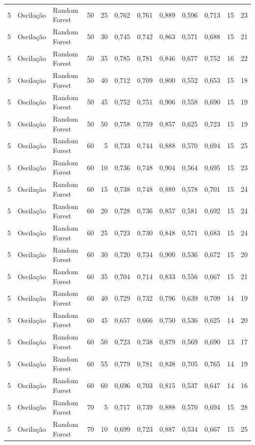 \begin{longtable}{@{}rllrrrrrrrrr@{}}
5 & Oscilação & Random Forest & 50 & 25 & 0,762 & 0,761 & 0,889 & 0,596 & 0,713 & 15 & 23 \\
5 & Oscilação & Random Forest & 50 & 30 & 0,745 & 0,742 & 0,863 & 0,571 & 0,688 & 15 & 21 \\
5 & Oscilação & Random Forest & 50 & 35 & 0,785 & 0,781 & 0,846 & 0,677 & 0,752 & 16 & 22 \\
5 & Oscilação & Random Forest & 50 & 40 & 0,712 & 0,709 & 0,800 & 0,552 & 0,653 & 15 & 18 \\
5 & Oscilação & Random Forest & 50 & 45 & 0,752 & 0,751 & 0,906 & 0,558 & 0,690 & 15 & 19 \\
5 & Oscilação & Random Forest & 50 & 50 & 0,758 & 0,759 & 0,857 & 0,625 & 0,723 & 15 & 19 \\
5 & Oscilação & Random Forest & 60 & 5 & 0,733 & 0,744 & 0,888 & 0,570 & 0,694 & 15 & 25 \\
5 & Oscilação & Random Forest & 60 & 10 & 0,736 & 0,748 & 0,904 & 0,564 & 0,695 & 15 & 23 \\
5 & Oscilação & Random Forest & 60 & 15 & 0,738 & 0,748 & 0,889 & 0,578 & 0,701 & 15 & 24 \\
5 & Oscilação & Random Forest & 60 & 20 & 0,728 & 0,736 & 0,857 & 0,581 & 0,692 & 15 & 24 \\
5 & Oscilação & Random Forest & 60 & 25 & 0,723 & 0,730 & 0,848 & 0,571 & 0,683 & 15 & 24 \\
5 & Oscilação & Random Forest & 60 & 30 & 0,720 & 0,734 & 0,900 & 0,536 & 0,672 & 15 & 20 \\
5 & Oscilação & Random Forest & 60 & 35 & 0,704 & 0,714 & 0,833 & 0,556 & 0,667 & 15 & 21 \\
5 & Oscilação & Random Forest & 60 & 40 & 0,729 & 0,732 & 0,796 & 0,639 & 0,709 & 14 & 19 \\
5 & Oscilação & Random Forest & 60 & 45 & 0,657 & 0,666 & 0,750 & 0,536 & 0,625 & 14 & 20 \\
5 & Oscilação & Random Forest & 60 & 50 & 0,723 & 0,738 & 0,879 & 0,569 & 0,690 & 13 & 17 \\
5 & Oscilação & Random Forest & 60 & 55 & 0,779 & 0,781 & 0,838 & 0,705 & 0,765 & 14 & 19 \\
5 & Oscilação & Random Forest & 60 & 60 & 0,696 & 0,703 & 0,815 & 0,537 & 0,647 & 14 & 16 \\
5 & Oscilação & Random Forest & 70 & 5 & 0,717 & 0,739 & 0,888 & 0,570 & 0,694 & 15 & 28 \\
5 & Oscilação & Random Forest & 70 & 10 & 0,699 & 0,723 & 0,887 & 0,534 & 0,667 & 15 & 25 \\

\end{longtable}

